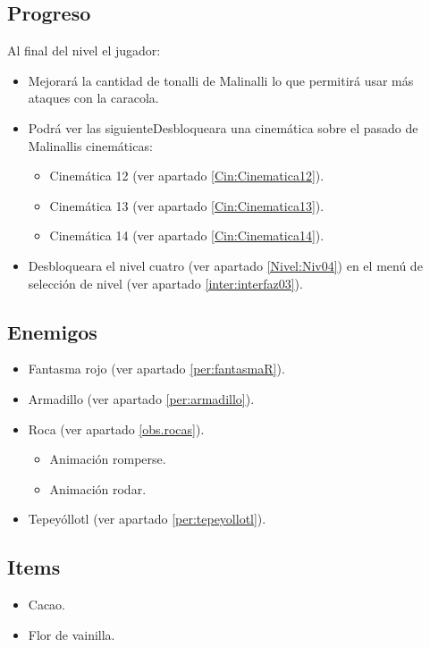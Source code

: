 	\subsection{Progreso}
Al final del nivel el jugador:
\begin{itemize}
	\item Mejorará la cantidad de tonalli de Malinalli lo que permitirá usar más ataques con la caracola.
	\item Podrá ver las siguienteDesbloqueara una cinemática sobre el pasado de Malinallis cinemáticas: 
		\begin{itemize}
			\item Cinemática 12 (ver apartado \ref{Cin:Cinematica12}).
			\item Cinemática 13 (ver apartado \ref{Cin:Cinematica13}).
			\item Cinemática 14 (ver apartado \ref{Cin:Cinematica14}).
		\end{itemize}
	\item Desbloqueara el nivel cuatro (ver apartado \ref{Nivel:Niv04}) en el menú de selección de nivel (ver apartado \ref{inter:interfaz03}).
\end{itemize} 
	\subsection{Enemigos}
\begin{itemize}
	\item 	Fantasma rojo (ver apartado \ref{per:fantasmaR}).
		
	\item Armadillo (ver apartado \ref{per:armadillo}).
	\item Roca (ver apartado \ref{obs.rocas}).
		\begin{itemize}
			\item Animación romperse.
			\item Animación rodar.
		\end{itemize}
	\item Tepeyóllotl (ver apartado \ref{per:tepeyollotl}). 

\end{itemize}
	\subsection{Items}
\begin{itemize}
	\item 	Cacao.
	\item	Flor de vainilla.
\end{itemize}
